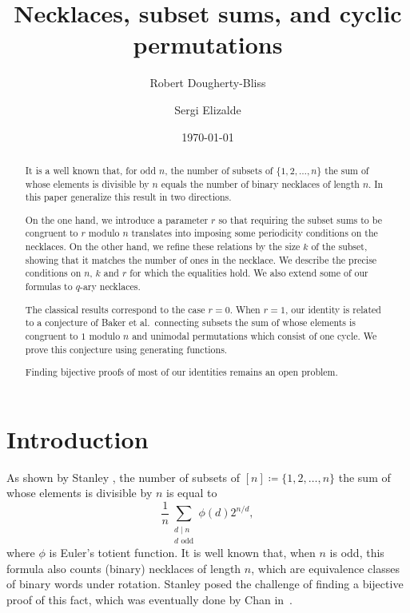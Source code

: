 \documentclass[12pt]{article}
\title{Necklaces, subset sums, and cyclic permutations}
\author{Robert Dougherty-Bliss \and Sergi Elizalde}
\date{\today}
\theoremstyle{definition}
\begin{document}
\maketitle

\begin{abstract}
    It is a well known that, for odd $n$, the number of subsets of $\{1,2,\dots,n\}$ the sum of whose elements is divisible by $n$ equals the number of binary necklaces of length $n$. In this paper generalize this result in two directions.

    On the one hand, we introduce a parameter $r$ so that requiring the subset sums to be congruent to $r$ modulo $n$ translates into imposing some periodicity conditions on the necklaces. 
    On the other hand, we refine these relations by the size $k$ of the subset, showing that it matches the number of ones in the necklace.
    We describe the precise conditions on $n$, $k$ and $r$ for which the equalities hold. We also extend some of our formulas to $q$-ary necklaces.

    The classical results correspond to the case $r=0$. When $r=1$, our identity is related to a conjecture of Baker et al.\ connecting subsets the sum of whose elements is congruent to $1$ modulo $n$ and unimodal permutations which consist of one cycle. We prove this conjecture using generating functions.

    Finding bijective proofs of most of our identities remains an open problem.
\end{abstract}


\section{Introduction}\label{sec:intro}

As shown by Stanley \cite[Exer.~1.105]{EC1}, the number of subsets of $[n]\coloneqq\{1,2,\dots,n\}$ the sum of whose elements is divisible by $n$ is equal to
\begin{equation}\label{eq:subsets_odd}
    \frac{1}{n} \sum_{\substack{d \mid n \\ d \text{ odd}}} \phi(d) 2^{n / d},
\end{equation}
where $\phi$ is Euler's totient function. It is well known that, when $n$ is
odd, this formula also counts (binary) necklaces of length $n$, which are
equivalence classes of binary words under rotation. Stanley posed the challenge
of finding a bijective proof of this fact, which was eventually done by Chan in~\cite{Chan}.
\end{document}
